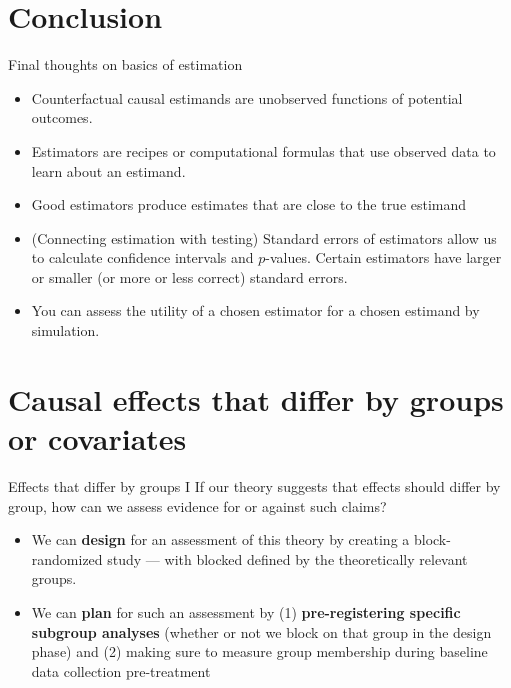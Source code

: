 \documentclass[
  ignorenonframetext,
]{beamer}
\begin{document}
\hypertarget{conclusion}{%
\section{Conclusion}\label{conclusion}}

\begin{frame}{Final thoughts on basics of estimation}
\protect\hypertarget{final-thoughts-on-basics-of-estimation}{}
\begin{itemize}
\item
  Counterfactual causal estimands are unobserved functions of potential
  outcomes.
\item
  Estimators are recipes or computational formulas that use observed
  data to learn about an estimand.
\item
  Good estimators produce estimates that are close to the true estimand
\item
  (Connecting estimation with testing) Standard errors of estimators
  allow us to calculate confidence intervals and \(p\)-values. Certain
  estimators have larger or smaller (or more or less correct) standard
  errors.
\item
  You can assess the utility of a chosen estimator for a chosen estimand
  by simulation.
\end{itemize}
\end{frame}

\hypertarget{causal-effects-that-differ-by-groups-or-covariates}{%
\section{Causal effects that differ by groups or
covariates}\label{causal-effects-that-differ-by-groups-or-covariates}}

\begin{frame}{Effects that differ by groups I}
\protect\hypertarget{effects-that-differ-by-groups-i}{}
If our theory suggests that effects should differ by group, how can we
assess evidence for or against such claims?

\begin{itemize}
\item
  We can \textbf{design} for an assessment of this theory by creating a
  block-randomized study --- with blocked defined by the theoretically
  relevant groups.
\item
  We can \textbf{plan} for such an assessment by (1)
  \textbf{pre-registering specific subgroup analyses} (whether or not we
  block on that group in the design phase) and (2) making sure to
  measure group membership during baseline data collection pre-treatment
\end{itemize}
\end{frame}
\end{document}
